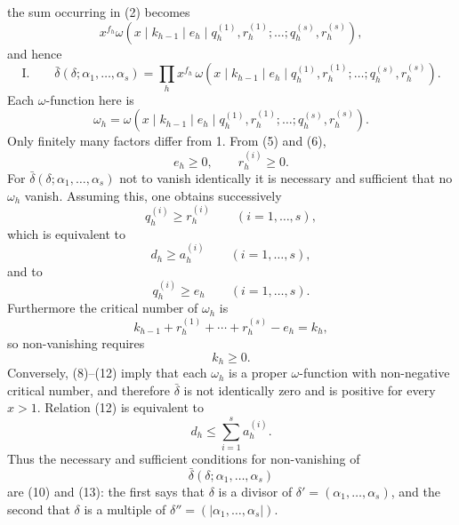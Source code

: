 \documentclass[11pt,a4paper]{article}
\begin{document}
the sum occurring in (2) becomes
\[
 x^{f_h}\omega(x\mid k_{h-1}\mid e_h\mid q_h^{(1)},r_h^{(1)};\ldots;q_h^{(s)},r_h^{(s)}),
\]
and hence
\[
\text{I.}\qquad
 \bar\delta(\delta;\alpha_1,
\ldots,\alpha_s)=\prod_h x^{f_h}\,
 \omega(x\mid k_{h-1}\mid e_h\mid q_h^{(1)},r_h^{(1)};\ldots;q_h^{(s)},r_h^{(s)}).
\]
Each $\omega$-function here is
\begin{equation}
 \omega_h=\omega(x\mid k_{h-1}\mid e_h\mid q_h^{(1)},r_h^{(1)};\ldots;q_h^{(s)},r_h^{(s)}).
\tag{7}
\end{equation}
Only finitely many factors differ from 1. From (5) and (6),
\begin{equation}
 e_h\ge0,
 \qquad r_h^{(i)}\ge0.
\tag{8}
\end{equation}
For $\bar\delta(\delta;\alpha_1,
\ldots,\alpha_s)$ not to vanish identically it is necessary and sufficient that no $\omega_h$ vanish. Assuming this, one obtains successively
\begin{equation}
 q_h^{(i)}\ge r_h^{(i)}\qquad(i=1,
\ldots,s),
\tag{9}
\end{equation}
which is equivalent to
\begin{equation}
 d_h\ge a_h^{(i)}\qquad(i=1,
\ldots,s),
\tag{10}
\end{equation}
and to
\begin{equation}
 q_h^{(i)}\ge e_h\qquad(i=1,
\ldots,s).
\tag{11}
\end{equation}
Furthermore the critical number of $\omega_h$ is
\[
 k_{h-1}+r_h^{(1)}+\cdots+r_h^{(s)}-e_h=k_h,
\]
so non-vanishing requires
\begin{equation}
 k_h\ge0.
\tag{12}
\end{equation}
Conversely, (8)--(12) imply that each $\omega_h$ is a proper $\omega$-function with non-negative critical number, and therefore $\bar\delta$ is not identically zero and is positive for every $x>1$. Relation (12) is equivalent to
\begin{equation}
 d_h\le\sum_{i=1}^s a_h^{(i)}.
\tag{13}
\end{equation}
Thus the necessary and sufficient conditions for non-vanishing of
\[
 \bar\delta(\delta;\alpha_1,
\ldots,\alpha_s)
\]
are (10) and (13): the first says that $\delta$ is a divisor of $\delta'=(\alpha_1,
\ldots,\alpha_s)$, and the second that $\delta$ is a multiple of $\delta''=(|\alpha_1,
\ldots,\alpha_s|)$.
\end{document}
